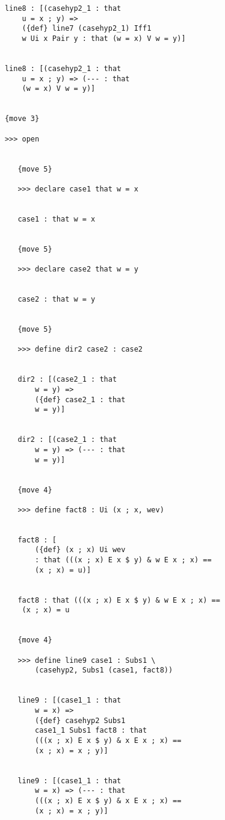 \documentclass[12pt]{article}
\begin{document}
\begin{verbatim}
            line8 : [(casehyp2_1 : that 
                u = x ; y) => 
                ({def} line7 (casehyp2_1) Iff1 
                w Ui x Pair y : that (w = x) V w = y)]


            line8 : [(casehyp2_1 : that 
                u = x ; y) => (--- : that 
                (w = x) V w = y)]


            {move 3}

            >>> open


               {move 5}

               >>> declare case1 that w = x


               case1 : that w = x


               {move 5}

               >>> declare case2 that w = y


               case2 : that w = y


               {move 5}

               >>> define dir2 case2 : case2


               dir2 : [(case2_1 : that 
                   w = y) => 
                   ({def} case2_1 : that 
                   w = y)]


               dir2 : [(case2_1 : that 
                   w = y) => (--- : that 
                   w = y)]


               {move 4}

               >>> define fact8 : Ui (x ; x, wev)


               fact8 : [
                   ({def} (x ; x) Ui wev 
                   : that (((x ; x) E x $ y) & w E x ; x) == 
                   (x ; x) = u)]


               fact8 : that (((x ; x) E x $ y) & w E x ; x) == 
                (x ; x) = u


               {move 4}

               >>> define line9 case1 : Subs1 \
                   (casehyp2, Subs1 (case1, fact8))


               line9 : [(case1_1 : that 
                   w = x) => 
                   ({def} casehyp2 Subs1 
                   case1_1 Subs1 fact8 : that 
                   (((x ; x) E x $ y) & x E x ; x) == 
                   (x ; x) = x ; y)]


               line9 : [(case1_1 : that 
                   w = x) => (--- : that 
                   (((x ; x) E x $ y) & x E x ; x) == 
                   (x ; x) = x ; y)]



\end{verbatim}
\end{document}
